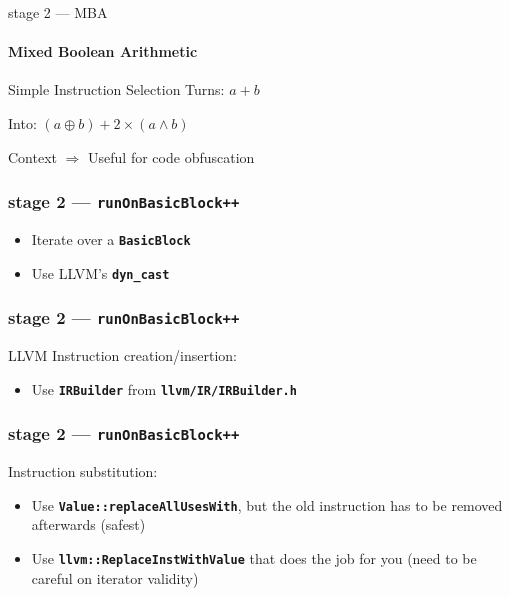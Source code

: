 \documentclass[14pt]{beamer}
\newcommand{\Code}[1]{\textbf{\texttt{#1}}}
\begin{document}
    \begin{frame}{stage 2 --- MBA}
        \framesubtitle{Mixed Boolean Arithmetic}

        \begin{alertblock}{Simple Instruction Selection}
            Turns: $a + b$

            Into: $(a \oplus b) + 2 \times (a \wedge b)$
        \end{alertblock}

        \begin{block}{Context}
            \alert{$\Rightarrow$} Useful for code obfuscation
        \end{block}

    \end{frame}

    \begin{frame}[containsverbatim]
    \frametitle{stage 2 --- \texttt{runOnBasicBlock++}}
    \begin{itemize}
        \item Iterate over a \Code{BasicBlock}
        \item Use LLVM's \Code{dyn\_cast}
    \end{itemize}
    {
        \scriptsize
        
    }
    \end{frame}

    \begin{frame}[containsverbatim]
    \frametitle{stage 2 --- \texttt{runOnBasicBlock++}}
    LLVM Instruction creation/insertion:
    \begin{itemize}
        \item Use \Code{IRBuilder} from \Code{llvm/IR/IRBuilder.h}
    \end{itemize}
    \hspace{-5em}%
    \begin{minipage}{\textwidth}
        \scriptsize
        
    \end{minipage}
    \end{frame}

    \begin{frame}[containsverbatim]
    \frametitle{stage 2 --- \texttt{runOnBasicBlock++}}
    Instruction substitution:
    \begin{itemize}
		\item Use \Code{Value::replaceAllUsesWith}, but the old instruction has
			to be removed afterwards (safest)
		\item Use \Code{llvm::ReplaceInstWithValue} that does the job for you
			(need to be careful on iterator validity)
    \end{itemize}
    \hspace{-6em}%
    \begin{minipage}{\textwidth}
        \footnotesize
        
    \end{minipage}
    \end{frame}
\end{document}
